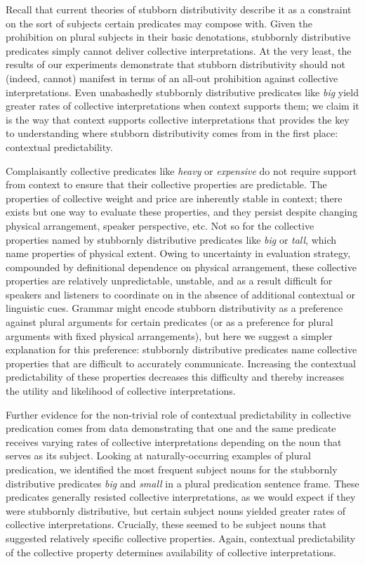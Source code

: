 \documentclass[preprint,12pt,authoryear,titlepage]{elsarticle}
\begin{document}
Recall that current theories of stubborn distributivity describe it as a constraint on the sort of subjects certain predicates may compose with. 
Given the prohibition on plural subjects in their basic denotations, stubbornly distributive predicates simply cannot deliver collective interpretations. At the very least, the results of our experiments demonstrate that stubborn distributivity should not (indeed, cannot) manifest in terms of an all-out prohibition against collective interpretations. Even unabashedly stubbornly distributive predicates like \emph{big} yield greater rates of collective interpretations when context supports them; we claim it is the way that context supports collective interpretations that provides the key to understanding where stubborn distributivity comes from in the first place: contextual predictability.

Complaisantly collective predicates like \emph{heavy} or \emph{expensive} do not require support from context to ensure that their collective properties are predictable. The properties of collective weight and price are inherently stable in context; there exists but one way to evaluate these properties, and they persist despite changing physical arrangement, speaker perspective, etc. Not so for the collective properties named by stubbornly distributive predicates like \emph{big} or \emph{tall}, which name properties of physical extent. Owing to uncertainty in evaluation strategy, compounded by definitional dependence on physical arrangement, these collective properties are relatively unpredictable, unstable, and as a result difficult for speakers and listeners to coordinate on in the absence of additional contextual or linguistic cues. Grammar might encode stubborn distributivity as a preference against plural arguments for certain predicates (or as a preference for plural arguments with fixed physical arrangements), but here we suggest a simpler explanation for this preference: stubbornly distributive predicates name collective properties that are difficult to accurately communicate. Increasing the contextual predictability of these properties decreases this difficulty and thereby increases the utility and likelihood of collective interpretations.

Further evidence for the non-trivial role of contextual predictability in collective predication comes from data demonstrating that one and the same predicate receives varying rates of collective interpretations depending on the noun that serves as its subject. Looking at naturally-occurring examples of plural predication, we identified the most frequent subject nouns for the stubbornly distributive predicates \emph{big} and \emph{small} in a plural predication sentence frame. These predicates generally resisted collective interpretations, as we would expect if they were stubbornly distributive, but certain subject nouns yielded greater rates of collective interpretations. Crucially, these seemed to be subject nouns that suggested relatively specific collective properties. 
Again, contextual predictability of the collective property determines availability of collective interpretations.
\end{document}
